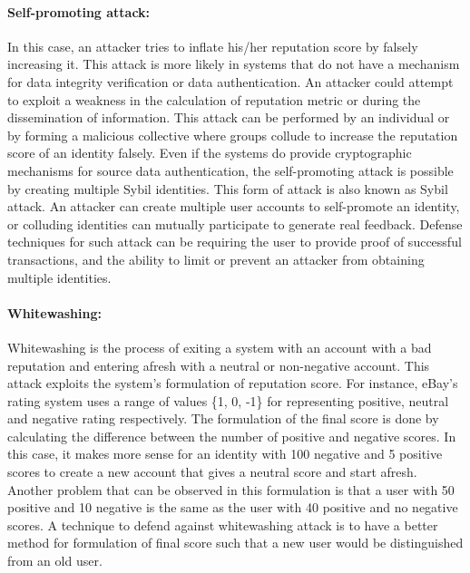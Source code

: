 \paragraph{Self-promoting attack:} In this case, an attacker tries to inflate
his/her reputation score by falsely increasing it. This attack is more likely
in systems that do not have a mechanism for data integrity verification or data
authentication. An attacker could attempt to exploit a weakness in the
calculation of reputation metric or during the dissemination of information.
This attack can be performed by an individual or by forming a malicious
collective where groups collude to increase the reputation score of an identity
falsely. Even if the systems do provide cryptographic mechanisms for source
data authentication, the self-promoting attack is possible by creating multiple
Sybil identities. This form of attack is also known as Sybil attack. An
attacker can create multiple user accounts to self-promote an identity, or
colluding identities can mutually participate to generate real feedback.
Defense techniques for such attack can be requiring the user to provide proof
of successful transactions, and the ability to limit or prevent an attacker
from obtaining multiple identities. 
\paragraph{Whitewashing:} Whitewashing is the process of exiting a system with
an account with a bad reputation and entering afresh with a neutral or
non-negative account. This attack exploits the system's formulation of
reputation score. For instance, eBay's rating system uses a range of values
\{1, 0, -1\} for representing positive, neutral and negative rating
respectively. The formulation of the final score is done by calculating the
difference between the number of positive and negative scores. In this case, it
makes more sense for an identity with 100 negative and 5 positive scores to
create a new account that gives a neutral score and start afresh. Another
problem that can be observed in this formulation is that a user with 50
positive and 10 negative is the same as the user with 40 positive and no
negative scores. A technique to defend against whitewashing attack is to have a
better method for formulation of final score such that a new user would be
distinguished from an old user. 
